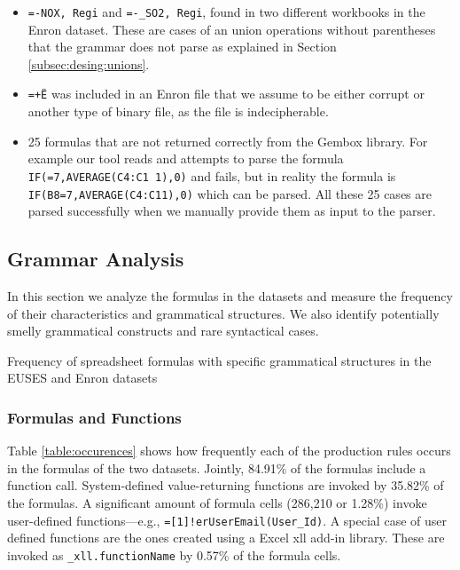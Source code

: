 \documentclass[conference]{IEEEtran}
\begin{document}
\begin{itemize}
	\item \texttt{=-NOX, Regi} and \texttt{=-_SO2, Regi}, found in two different workbooks in the Enron dataset. These are cases of an union operations without parentheses that the grammar does not parse as explained in Section \ref{subsec:desing:unions}.
	\item \texttt{=+Ë\textperthousand} was included in an Enron file that we assume to be either corrupt or another type of binary file, as the file is indecipherable.
	\item 25 formulas that are not returned correctly from the Gembox library. For example our tool reads and attempts to parse the formula \texttt{IF(=7,AVERAGE(C4:C1 1),0)} and fails, but in reality the formula is \texttt{IF(B8=7,AVERAGE(C4:C11),0)} which can be parsed. All these 25 cases are parsed successfully when we manually provide them as input to the parser.
\end{itemize}

\subsection{Grammar Analysis}
\label{subsection:grammarAnalysis}
In this section we analyze the formulas in the datasets and measure the frequency of their characteristics and grammatical structures. We also identify potentially smelly grammatical constructs and rare syntactical cases.
\begin{table}
	\caption{Frequency of spreadsheet formulas with specific grammatical structures in the EUSES and Enron datasets}
	\label{table:occurences}
	\centering
	
\end{table}

\subsubsection{Formulas and Functions}

Table \ref{table:occurences} shows how frequently each of the production rules occurs in the formulas of the two datasets. Jointly, 84.91\% of the formulas include a function call. System-defined value-returning functions are invoked by 35.82\% of the formulas.
A significant amount of formula cells (286,210 or 1.28\%) invoke user-defined functions---e.g., \texttt{=[1]!erUserEmail(User_Id)}. A special case of user defined functions are the ones created using a Excel xll add-in library. These are invoked as \texttt{_xll.functionName} by 0.57\% of the formula cells.
\end{document}
